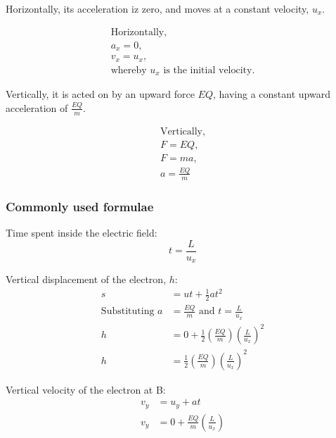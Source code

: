 \documentclass[../../../main.tex]{subfiles}
\begin{document}
Horizontally, its acceleration iz zero, and moves at a constant velocity, \(u_x\).

\begin{gather*}
    \text{Horizontally, } \\
    a_x =0,               \\
    v_x =u_x,               \\
    \text{whereby \(u_x\) is the initial velocity.}
\end{gather*}

Vertically, it is acted on by an upward force \(EQ\), having a constant upward acceleration of $\frac{EQ}{m}$.

\begin{gather*}
    \text{Vertically,} \\
    F=EQ,             \\
    F=ma,             \\
    a=\frac{EQ}{m}
\end{gather*}

\newpage

\subsubsection{Commonly used formulae}
\begin{mdframed}
    Time spent inside the electric field:
    \begin{equation}
        t=\frac{L}{u_x}
    \end{equation}
\end{mdframed}

\begin{mdframed}
    Vertical displacement of the electron, \(h\):
    \begin{align}
        s                      & =ut+\frac{1}{2}at^2                           \\
        \text{Substituting } a & =\frac{EQ}{m} \text{ and } t=\frac{L}{u_x}    \\
        h                      & =0+\frac{1}{2}(\frac{EQ}{m})(\frac{L}{u_x})^2 \\
        h                      & =\frac{1}{2}(\frac{EQ}{m})(\frac{L}{u_x})^2
    \end{align}
\end{mdframed}

\begin{mdframed}
    Vertical velocity of the electron at B:
    \begin{align}
        v_y & =u_y+at                        \\
        v_y & =0+\frac{EQ}{m}(\frac{L}{u_x})
    \end{align}
\end{mdframed}
\end{document}
